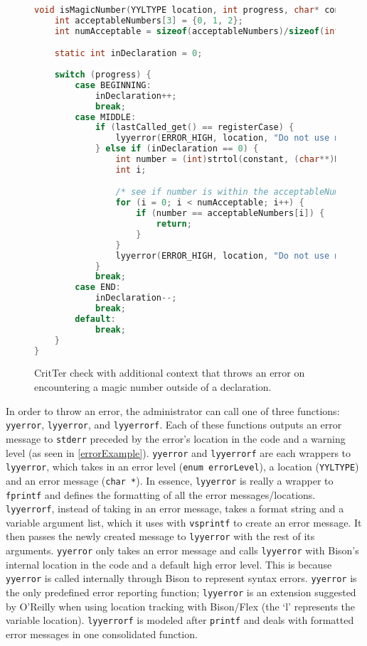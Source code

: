 \documentclass[12pt]{report}
\newcommand{\programName}{CritTer\xspace}
\begin{document}
\begin{figure}
\begin{lstlisting}[language=C]
void isMagicNumber(YYLTYPE location, int progress, char* constant) {
	int acceptableNumbers[3] = {0, 1, 2};
	int numAcceptable = sizeof(acceptableNumbers)/sizeof(int);

	static int inDeclaration = 0;
	
	switch (progress) {
		case BEGINNING:
			inDeclaration++;
			break;
		case MIDDLE:
			if (lastCalled_get() == registerCase) {
				lyyerror(ERROR_HIGH, location, "Do not use magic numbers");
			} else if (inDeclaration == 0) {
				int number = (int)strtol(constant, (char**)NULL, 0);
				int i;

				/* see if number is within the acceptableNumbers array */
				for (i = 0; i < numAcceptable; i++) {
					if (number == acceptableNumbers[i]) {
						return;
					}
				}
				lyyerror(ERROR_HIGH, location, "Do not use magic numbers");
			}
			break;
		case END:
			inDeclaration--;
			break;
		default:
			break;
	}
}
\end{lstlisting}
\caption[\programName Check with Additional Context]{\programName check with additional context that throws an error on encountering a magic number outside of a declaration.}
\label{checkWithContext}
\end{figure}

\newcommand{\yyerror}{\lstinline{yyerror}\xspace}
\newcommand{\lyyerror}{\lstinline{lyyerror}\xspace}
\newcommand{\lyyerrorf}{\lstinline{lyyerrorf}\xspace}

In order to throw an error, the administrator can call one of three functions: \yyerror, \lyyerror, and 
\lyyerrorf. Each of these functions outputs an error message to \lstinline{stderr} preceded by the error's 
location in the code and a warning level (as seen in \autoref{errorExample}). \yyerror and \lyyerrorf 
are each wrappers to \lyyerror, which takes in an error level (\lstinline{enum errorLevel}), a location 
(\lstinline{YYLTYPE}) and an error message (\lstinline{char *}). In essence, \lyyerror is really a wrapper 
to \lstinline{fprintf} and defines the formatting of all the error messages\slash locations. \lyyerrorf, instead 
of taking in an error message, takes a format string and a variable argument list, which it uses with 
\lstinline{vsprintf} to create an error message. It then passes the newly created message to \lyyerror with 
the rest of its arguments. \yyerror only takes an error message and calls \lyyerror with Bison's internal 
location in the code and a default high error level. This is because \yyerror is called internally through 
Bison to represent syntax errors. \yyerror is the only predefined error reporting function; \lyyerror is an 
extension suggested by O'Reilly\cite{flex-and-bison} when using location tracking with Bison\slash Flex 
(the `l' represents the variable location). \lyyerrorf is modeled after \lstinline{printf} and deals with 
formatted error messages in one consolidated function.
\end{document}
